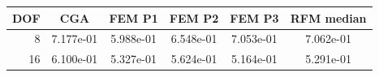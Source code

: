 \begin{tabular}{rccccc}
\toprule
DOF & CGA & FEM P1 & FEM P2 & FEM P3 & RFM median \\
\midrule
8 & 7.177e-01 & 5.988e-01 & 6.548e-01 & 7.053e-01 & 7.062e-01 \\
16 & 6.100e-01 & 5.327e-01 & 5.624e-01 & 5.164e-01 & 5.291e-01 \\
\bottomrule
\end{tabular}
